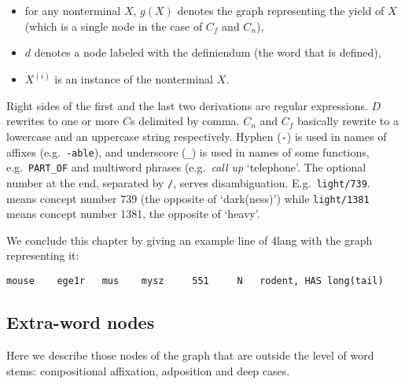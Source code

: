 \documentclass[a4paper,10pt]{article}
\begin{document}
\begin{itemize}
 \item for any nonterminal $X$, $g(X)$ denotes the graph representing the yield of $X$ (which is a single node in the case of $C_f$ and $C_n$),
 \item $d$ denotes a node labeled with the definiendum (the word that is defined),
 \item $X^{(i)}$ is an instance of the nonterminal $X$.
\end{itemize}
Right sides of the first and the last two derivations are regular
expressions. $D$ rewrites to one or more $C$s delimited by comma. $C_n$ and
$C_f$ basically rewrite to a lowercase and an uppercase string
respectively. Hyphen (\texttt{-}) is used in names of affixes
(e.g.\ \texttt{-able}), and underscore (\texttt{\_}) is used in names of some
functions, e.g.\ \texttt{PART\_OF} and multiword phrases (e.g.\ \emph{call up} `telephone'.
 The optional number at the end, separated
by \texttt{/}, serves disambiguation. E.g.\ \texttt{light/739}.  means concept
number 739 (the opposite of `dark(ness)') while \texttt{light/1381} means
concept number 1381, the opposite of `heavy'.

We conclude this chapter by giving an example line of 4lang with the graph representing it:

\begin{verbatim}
mouse	 ege1r	 mus	mysz	 551	 N	 rodent, HAS long(tail)
\end{verbatim}
\subsection{Extra-word nodes}\label{sec_extraword}
Here we describe those nodes of the graph that are outside the level of word
stems: compositional affixation, adposition and deep cases.%
\end{document}
